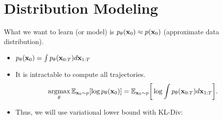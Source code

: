 \section{Distribution Modeling}
	What we want to learn (or model) is $p_\theta({\mathbf{x}}_0)\approx p({\mathbf{x}}_0)$ (approximate data distribution).
	\begin{itemize}
		\item $p_\theta({\mathbf{x}}_0) = \int p_\theta({\mathbf{x}}_{0:T})d{\mathbf{x}}_{1:T}$
		\item It is intractable to compute all trajectories.
			$$\operatorname*{\operatorname{argmax}}_\theta\mathbb{E}_{{\mathbf{x}}_0\sim p}[\log p_\theta({\mathbf{x}}_0)] = \mathbb{E}_{{\mathbf{x}}_0\sim p}\bigg[\log\int p_\theta({\mathbf{x}}_{0:T})d{\mathbf{x}}_{1:T}\bigg].$$
		\item Thus, we will use variational lower bound with KL-Div:
	\end{itemize}

